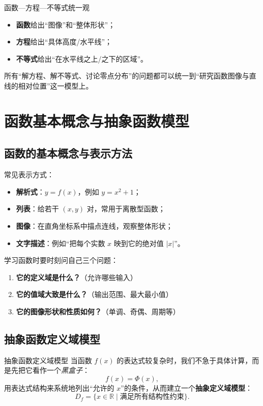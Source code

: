 \documentclass[a4paper,11pt]{ctexart}
\begin{document}
\begin{summarybox}[mathnote coverage=line]{函数—方程—不等式统一观}
  \begin{itemize}
    \item \textbf{函数}给出“图像”和“整体形状”；
    \item \textbf{方程}给出“具体高度/水平线”；
    \item \textbf{不等式}给出“在水平线之上/之下的区域”。
  \end{itemize}
  所有“解方程、解不等式、讨论零点分布”的问题都可以统一到“研究函数图像与直线的相对位置”这一模型上。
\end{summarybox}

\section{函数基本概念与抽象函数模型}

\subsection{函数的基本概念与表示方法}

常见表示方式：

\begin{itemize}
  \item \textbf{解析式}：$y=f(x)$，例如 $y=x^2+1$；
  \item \textbf{列表}：给若干 $(x,y)$ 对，常用于离散型函数；
  \item \textbf{图像}：在直角坐标系中描点连线，观察整体形状；
  \item \textbf{文字描述}：例如“把每个实数 $x$ 映到它的绝对值 $|x|$”。
\end{itemize}

学习函数时要时刻问自己三个问题：

\begin{enumerate}
  \item \textbf{它的定义域是什么？}（允许哪些输入）
  \item \textbf{它的值域大致是什么？}（输出范围、最大最小值）
  \item \textbf{它的图像形状和性质如何？}（单调、奇偶、周期等）
\end{enumerate}

\subsection{抽象函数定义域模型}

\begin{definitionbox}{抽象函数定义域模型}
  当函数 $f(x)$ 的表达式较复杂时，我们不急于具体计算，而是先把它看作一个\emph{黑盒子}：
  \[
    f(x) = \Phi(x),
  \]
  用表达式结构来系统地列出“允许的 $x$”的条件，从而建立一个\textbf{抽象定义域模型}：
  \[
    D_f = \{x\in\mathbb{R}\mid \text{满足所有结构性约束}\}.
  \]
\end{definitionbox}
\end{document}
